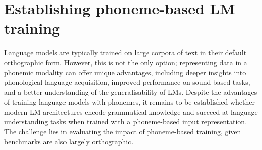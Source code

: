 \chapter{Establishing phoneme-based LM training}\label{chapter:modelling}


Language models are typically trained on large corpora of text in their default orthographic form. However, this is not the only option; representing data in a phonemic modality can offer unique advantages, including deeper insights into phonological language acquisition, improved performance on sound-based tasks, and a better understanding of the generalisability of LMs. Despite the advantages of training language models with phonemes, it remains to be established whether modern LM architectures encode grammatical knowledge and succeed at language understanding tasks when trained with a phoneme-based input representation. The challenge lies in evaluating the impact of phoneme-based training, given benchmarks are also largely orthographic. 



